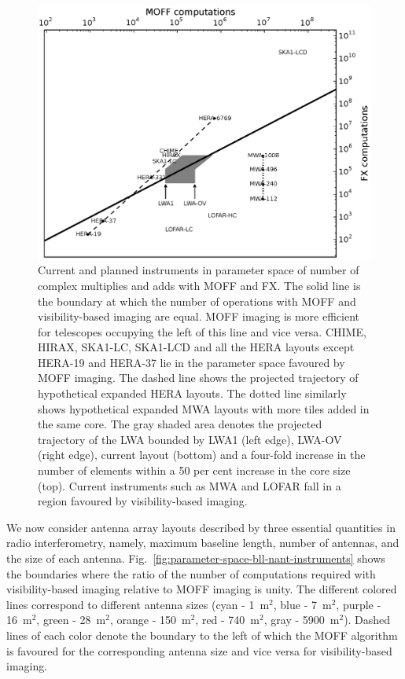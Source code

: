\documentclass[a4paper,fleqn,usenatbib]{mnras}
\begin{document}
\begin{figure}
  \includegraphics[width=\columnwidth]{figure11}
  \caption{Current and planned instruments in parameter space of
    number of complex multiplies and adds with MOFF and FX. The solid line
    is the boundary at which the number of operations with MOFF and 
    visibility-based imaging are equal. MOFF imaging is more efficient for 
    telescopes occupying the left of this line and vice versa. CHIME, HIRAX, 
    SKA1-LC, SKA1-LCD and all the HERA layouts except HERA-19 and HERA-37 lie 
    in the parameter space favoured by MOFF imaging. The dashed line shows the 
    projected trajectory of hypothetical expanded HERA layouts. The dotted line 
    similarly shows hypothetical expanded MWA layouts with more tiles added in 
    the same core. The gray shaded area denotes the projected trajectory of the 
    LWA bounded by LWA1 (left edge), LWA-OV (right edge), current layout 
    (bottom) and a four-fold increase in the number of elements within a 50 per 
    cent increase in the core size (top). Current instruments such as MWA and 
    LOFAR fall in a region favoured by visibility-based imaging.}
  \label{fig:parameter-space-computations-instruments}
\end{figure}

We now consider antenna array layouts described by three essential quantities in radio interferometry, namely, maximum baseline length, number of antennas, and the size of each antenna. Fig.~\ref{fig:parameter-space-bll-nant-instruments} shows the boundaries where the ratio of the number of computations required with visibility-based imaging relative to MOFF imaging is unity. The different colored lines correspond to different antenna sizes (cyan - 1~m$^2$, blue - 7~m$^2$, purple - 16~m$^2$, green - 28~m$^2$, orange - 150~m$^2$, red - 740~m$^2$, gray - 5900~m$^2$). Dashed lines of each color denote the boundary to the left of which the MOFF algorithm is favoured for the corresponding antenna size and vice versa for visibility-based imaging. 
\end{document}

